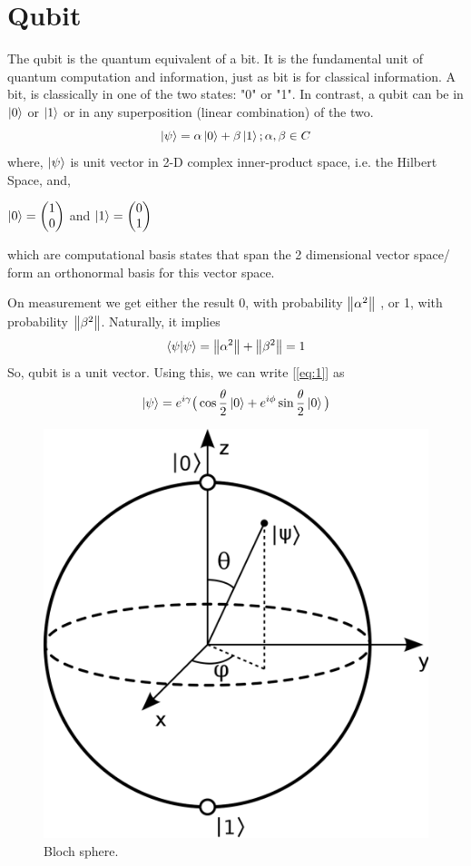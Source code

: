 \documentclass[11.5pt, paper=a4]{article}
\theoremstyle{definition}
\numberwithin{theorem}{section}
\begin{document}
\section{Qubit}
The qubit is the quantum equivalent of a bit. It is the fundamental unit of quantum computation and information, just as bit is for classical information.
A bit, is classically in one of the two states: "0" or "1". In contrast, a qubit can be in $\ket{0}$ or $\ket{1}$ or in any superposition (linear combination) of the two.
\begin{equation} \label{eq:1}
    \ket{\psi} = \alpha \ket{0} + \beta \ket{1}; \alpha, \beta \in C
\end{equation}
where, $\ket{\psi}$ is unit vector in 2-D complex inner-product space, i.e. the Hilbert Space, and, \\
\begin{center}
$\ket{0} =
\begin{pmatrix}
1 \\
0
\end{pmatrix} $ and $\ket{1} =
\begin{pmatrix}
0 \\
1
\end{pmatrix}    $
\end{center}
which are computational basis states that span the 2 dimensional vector space/ form an orthonormal basis for this vector space.

On measurement we get either the result 0, with probability  $\norm{\alpha^2}$ , or 1, with probability $\norm{\beta^2}$. Naturally, it implies
\begin{equation}
\braket{{\psi}|{\psi}}= \norm{\alpha^2}+ \norm{\beta^2} = 1
\end{equation}
So, qubit is a unit vector. Using this, we can write  [\ref{eq:1}] as
\begin{equation}
    \ket{\psi} = e^{i\gamma}\big(\cos{\frac{\theta}{2}}\ket{0} + e^{i\phi} \sin{\frac{\theta}{2}}\ket{0}\big)
\end{equation}
\begin{figure}[h]
\centering
\includegraphics[width=0.4\linewidth]{./images/bloch_sphere.png}
\caption{Bloch sphere. \cite{bloch_sphere}}
\label{fig:Bloch sphere}
\end{figure}
\end{document}
